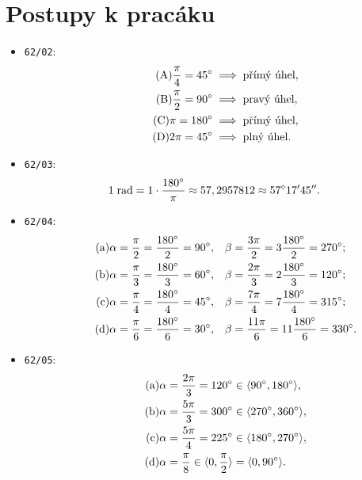 \documentclass[a4paper, 11pt]{article}
\begin{document}
	
	
	\section*{Postupy k pracáku}
	
	\begin{itemize}
		
		\item {\texttt{62/02}}:
			\begin{align}
				\tag{A}
				\frac \pi 4 = 45 \degree &\implies \text{přímý úhel},
			\\
				\tag{B}
				\frac \pi 2 = 90 \degree &\implies \text{pravý úhel},
			\\
				\tag{C}
				\pi = 180 \degree &\implies \text{přímý úhel},
			\\
				\tag{D}
				2 \pi = 45 \degree &\implies \text{plný úhel}.
				\end{align}
				
		\item \texttt{62/03}:
			\begin{align*}
				1 \; \mathrm{rad} = 1 \cdot \frac{180 \degree}{\pi} \approx 57,2957812 \approx 57\degree 17 ' 45 ''.
			\end{align*}
		
		\item \texttt{62/04}:
			\begin{align}
				\tag{a}
				\alpha &= \frac \pi 2 = \frac{180 \degree}{2} = 90 \degree, & \beta &= \frac{3\pi}{2} = 3 \frac{180\degree}{2} = 270\degree;
			\\
				\tag{b}
				\alpha &= \frac \pi 3 = \frac{180 \degree}{3} = 60 \degree, & \beta &= \frac{2\pi}{3} = 2 \frac{180\degree}{3} = 120\degree;
			\\
				\tag{c}
				\alpha &= \frac \pi 4 = \frac{180 \degree}{4} = 45 \degree, & \beta &= \frac{7\pi}{4} = 7 \frac{180\degree}{4} = 315\degree;
			\\
				\tag{d}
				\alpha &= \frac \pi 6 = \frac{180 \degree}{6} = 30 \degree, & \beta &= \frac{11\pi}{6} = 11 \frac{180\degree}{6} = 330\degree.
			\end{align}
		
		\item \texttt{62/05}:
			\begin{align}
				\tag{a}
				\alpha &= \frac{2\pi}{3} = 120\degree \in \langle 90\degree, 180\degree \rangle,
			\\
				\tag{b}
				\alpha &= \frac{5\pi}{3} = 300\degree \in \langle 270\degree, 360\degree \rangle,
			\\
				\tag{c}
				\alpha &= \frac{5\pi}{4} = 225\degree \in \langle 180\degree, 270\degree \rangle,
			\\
				\tag{d}
				\alpha &= \frac{\pi}{8} \in \langle 0, \frac{\pi}{2} \rangle = \langle 0, 90\degree \rangle.
			\end{align}
		

\end{itemize}
\end{document}
